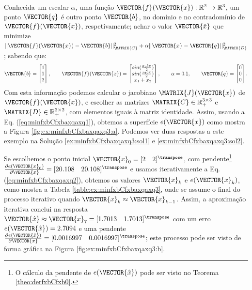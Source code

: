 \begin{example}
\label{ex:minfxbCfxbaxqaxq1}
Conhecida um escalar $\alpha$, uma função $\VECTOR{f}(\VECTOR{x}) : \mathbb{R}^{2} \rightarrow \mathbb{R}^{3}$,
um ponto $\VECTOR{q}$
é outro ponto $\VECTOR{b}$, no domínio e no contradomínio de $\VECTOR{f}(\VECTOR{x})$, respetivamente;
achar o valor $\VECTOR{\hat{x}}$ que minimize 
$||\VECTOR{f}(\VECTOR{x})-\VECTOR{b}||_{\MATRIX{C}}^2+\alpha||\VECTOR{x}-\VECTOR{q}||_{\MATRIX{D}}^2$;
sabendo que:
\begin{equation}
\VECTOR{b}=\begin{bmatrix}
1\\
1\\
2
\end{bmatrix},
\qquad 
\VECTOR{f}(\VECTOR{x})=\begin{bmatrix}
sin(\frac{x_1 5 \pi}{2})\\
sin(\frac{x_2 5 \pi}{2})\\
x_1+x_2
\end{bmatrix},
\qquad
\alpha=0.1,
\qquad
\VECTOR{q}=\begin{bmatrix}
0\\
0\\
0
\end{bmatrix}.
\end{equation}
Com esta informação podemos calcular o jacobiano $\MATRIX{J}(\VECTOR{x})$ de $\VECTOR{f}(\VECTOR{x})$,
 e escolher as matrizes $\MATRIX{C} \in \mathbb{R}^{3\times 3}_{+}$ e $\MATRIX{D} \in \mathbb{R}^{2\times 2}_{+}$, 
com elementos iguais à  matriz identidade. 
Assim, usando a Eq. (\ref{eq:minfxbCfxbaxqaxq1}),
obtemos a superfície $e(\VECTOR{x})$ como mostra a Figura \ref{fig:ex:minfxbCfxbaxqaxq3:a}.
Podemos ver duas respostas a este exemplo na Solução \ref{ex:minfxbCfxbaxqaxq3:sol1} e \ref{ex:minfxbCfxbaxqaxq3:sol2}.
\end{example}

\begin{SolutionT}
\label{ex:minfxbCfxbaxqaxq3:sol1}
Se escolhemos o ponto inicial $\VECTOR{x}_0=[2\quad 2]^{\transpose}$,
com pendente\footnote{O cálculo da
pendente de $e(\VECTOR{\hat{x}})$ pode ser visto no Teorema \ref{theo:derfxbCfxb0}.} 
$\frac{\partial e(\VECTOR{x}_0)}{\partial \VECTOR{x} }=[20.108\quad 20.108]^{\transpose}$ e 
usamos iterativamente a Eq. (\ref{eq:minfxbCfxbaxqaxq2}), obtemos os valores 
$\VECTOR{x}_k$ e $e(\VECTOR{x}_k)$, como mostra a Tabela \ref{table:ex:minfxbCfxbaxqaxq3},
onde se assume o final do processo iterativo quando $\VECTOR{x}_k \approx \VECTOR{x}_{k-1}$.
Assim, a aproximação iterativa conclui na resposta 
$\VECTOR{\hat{x}}\approx \VECTOR{x}_{7} =[1.7013\quad 1.7013]^{\transpose}$
com um erro $e(\VECTOR{\hat{x}})=2.7094$ e uma pendente
$\frac{\partial e(\VECTOR{\hat{x}})}{\partial \VECTOR{x} }=[0.0016997\quad 0.0016997]^{\transpose}$;
este processo pode ser visto de forma gráfica na Figura \ref{fig:ex:minfxbCfxbaxqaxq3:b}.
\end{SolutionT}

